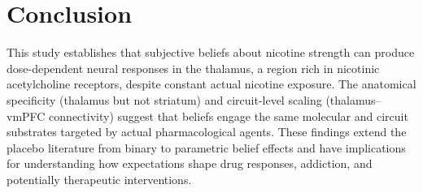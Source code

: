 \documentclass[11pt]{article}
\begin{document}
\section{Conclusion}

This study establishes that subjective beliefs about nicotine strength can produce dose-dependent neural responses in the thalamus, a region rich in nicotinic acetylcholine receptors, despite constant actual nicotine exposure. The anatomical specificity (thalamus but not striatum) and circuit-level scaling (thalamus--vmPFC connectivity) suggest that beliefs engage the same molecular and circuit substrates targeted by actual pharmacological agents. These findings extend the placebo literature from binary to parametric belief effects and have implications for understanding how expectations shape drug responses, addiction, and potentially therapeutic interventions.



\end{document}
